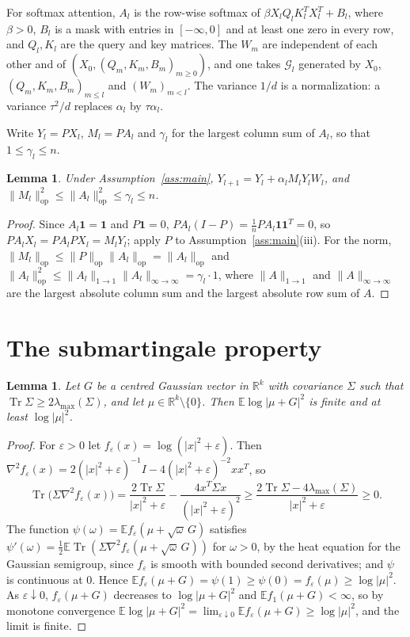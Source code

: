 \documentclass[11pt]{amsart}
\newtheorem{lemma}[theorem]{Lemma}
\theoremstyle{definition}
\theoremstyle{remark}
\numberwithin{equation}{section}
\newcommand{\EE}{\mathbb{E}}
\newcommand{\RR}{\mathbb{R}}
\newcommand{\cG}{\mathcal{G}}
\newcommand{\op}{\mathrm{op}}
\DeclareMathOperator{\Tr}{Tr}
\begin{document}
For softmax attention, $A_l$ is the row-wise softmax of $\beta X_lQ_lK_l^{T}X_l^{T}+B_l$, where $\beta>0$, $B_l$ is a mask with entries in $[-\infty,0]$ and at least one zero in every row, and $Q_l,K_l$ are the query and key matrices. The $W_m$ are independent of each other and of $(X_0,(Q_m,K_m,B_m)_{m\ge0})$, and one takes $\cG_l$ generated by $X_0$, $(Q_m,K_m,B_m)_{m\le l}$ and $(W_m)_{m<l}$. The variance $1/d$ is a normalization: a variance $\tau^2/d$ replaces $\alpha_l$ by $\tau\alpha_l$.

Write $Y_l=PX_l$, $M_l=PA_l$ and $\gamma_l$ for the largest column sum of $A_l$, so that $1\le\gamma_l\le n$.

\begin{lemma}\label{lem:reduce}
Under Assumption~\ref{ass:main}, $Y_{l+1}=Y_l+\alpha_lM_lY_lW_l$, and $\|M_l\|_\op^2\le\|A_l\|_\op^2\le\gamma_l\le n$.
\end{lemma}

\begin{proof}
Since $A_l\mathbf 1=\mathbf 1$ and $P\mathbf 1=0$, $PA_l(I-P)=\frac1nPA_l\mathbf 1\mathbf 1^{T}=0$, so $PA_lX_l=PA_lPX_l=M_lY_l$; apply $P$ to Assumption~\ref{ass:main}(iii). For the norm, $\|M_l\|_\op\le\|P\|_\op\|A_l\|_\op=\|A_l\|_\op$ and $\|A_l\|_\op^2\le\|A_l\|_{1\to1}\|A_l\|_{\infty\to\infty}=\gamma_l\cdot1$, where $\|A\|_{1\to1}$ and $\|A\|_{\infty\to\infty}$ are the largest absolute column sum and the largest absolute row sum of $A$.
\end{proof}

\section{The submartingale property}\label{sec:sub}

\begin{lemma}\label{lem:heat}
Let $G$ be a centred Gaussian vector in $\RR^k$ with covariance $\Sigma$ such that $\Tr\Sigma\ge2\lambda_{\max}(\Sigma)$, and let $\mu\in\RR^k\setminus\{0\}$. Then $\EE\log|\mu+G|^2$ is finite and at least $\log|\mu|^2$.
\end{lemma}

\begin{proof}
For $\varepsilon>0$ let $f_\varepsilon(x)=\log(|x|^2+\varepsilon)$. Then $\nabla^2f_\varepsilon(x)=2(|x|^2+\varepsilon)^{-1}I-4(|x|^2+\varepsilon)^{-2}xx^{T}$, so
\[
\Tr\bigl(\Sigma\nabla^2f_\varepsilon(x)\bigr)=\frac{2\Tr\Sigma}{|x|^2+\varepsilon}-\frac{4x^{T}\Sigma x}{(|x|^2+\varepsilon)^2}\ge\frac{2\Tr\Sigma-4\lambda_{\max}(\Sigma)}{|x|^2+\varepsilon}\ge0.
\]
The function $\psi(\omega)=\EE f_\varepsilon(\mu+\sqrt\omega\,G)$ satisfies $\psi'(\omega)=\frac12\EE\Tr(\Sigma\nabla^2f_\varepsilon(\mu+\sqrt\omega\,G))$ for $\omega>0$, by the heat equation for the Gaussian semigroup, since $f_\varepsilon$ is smooth with bounded second derivatives; and $\psi$ is continuous at $0$. Hence $\EE f_\varepsilon(\mu+G)=\psi(1)\ge\psi(0)=f_\varepsilon(\mu)\ge\log|\mu|^2$. As $\varepsilon\downarrow0$, $f_\varepsilon(\mu+G)$ decreases to $\log|\mu+G|^2$ and $\EE f_1(\mu+G)<\infty$, so by monotone convergence $\EE\log|\mu+G|^2=\lim_{\varepsilon\downarrow0}\EE f_\varepsilon(\mu+G)\ge\log|\mu|^2$, and the limit is finite.
\end{proof}
\end{document}
